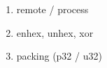 \begin{enumerate}
\item remote / process
\item enhex, unhex, xor
\item packing (p32 / u32)
\end{enumerate}
